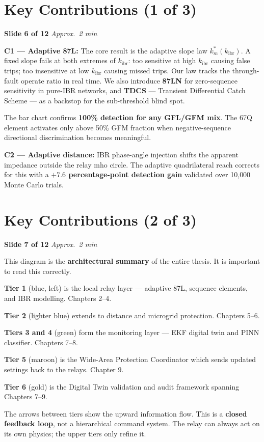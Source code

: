 \documentclass[12pt, a4paper]{article}
\newenvironment{notebox}{%
  \begin{tcolorbox}[
    colback=noteBg,
    colframe=iitmMaroon!40,
    boxrule=0.6pt,
    arc=3pt,
    left=8pt, right=8pt, top=6pt, bottom=6pt
  ]
  \setstretch{1.4}\small
}{%
  \end{tcolorbox}
}
\newcommand{\slidetag}[2]{%
  \noindent
  \textcolor{slideNum}{\footnotesize\bfseries Slide #1} \hfill
  \textcolor{iitmGold!80!black}{\footnotesize\itshape Approx.\ #2}\\[2pt]
}
\begin{document}
\section{Key Contributions (1 of 3)}

\slidetag{6 of 12}{2 min}
\begin{notebox}
\textbf{C1 --- Adaptive 87L:}
The core result is the adaptive slope law $k_m^*(k_\text{ibr})$.
A fixed slope fails at both extremes of $k_\text{ibr}$: too sensitive at high
$k_\text{ibr}$ causing false trips; too insensitive at low $k_\text{ibr}$ causing missed
trips. Our law tracks the through-fault operate ratio in real time.
We also introduce \textbf{87LN} for zero-sequence sensitivity in pure-IBR networks,
and \textbf{TDCS} --- Transient Differential Catch Scheme --- as a backstop for the
sub-threshold blind spot.

The bar chart confirms \textbf{100\% detection for any GFL/GFM mix}. The 67Q element
activates only above 50\% GFM fraction when negative-sequence directional discrimination
becomes meaningful.

\textbf{C2 --- Adaptive distance:}
IBR phase-angle injection shifts the apparent impedance outside the relay mho circle.
The adaptive quadrilateral reach corrects for this with a \textbf{$+7.6$ percentage-point
detection gain} validated over 10{,}000 Monte Carlo trials.
\end{notebox}

\section{Key Contributions (2 of 3)}

\slidetag{7 of 12}{2 min}
\begin{notebox}
This diagram is the \textbf{architectural summary} of the entire thesis. It is important
to read this correctly.

\textbf{Tier 1} (blue, left) is the local relay layer --- adaptive 87L, sequence
elements, and IBR modelling. Chapters 2--4.

\textbf{Tier 2} (lighter blue) extends to distance and microgrid protection.
Chapters 5--6.

\textbf{Tiers 3 and 4} (green) form the monitoring layer --- EKF digital twin and PINN
classifier. Chapters 7--8.

\textbf{Tier 5} (maroon) is the Wide-Area Protection Coordinator which sends updated
settings back to the relays. Chapter 9.

\textbf{Tier 6} (gold) is the Digital Twin validation and audit framework spanning
Chapters 7--9.

The arrows between tiers show the upward information flow. This is a
\textbf{closed feedback loop}, not a hierarchical command system. The relay can always
act on its own physics; the upper tiers only refine it.
\end{notebox}
\end{document}
